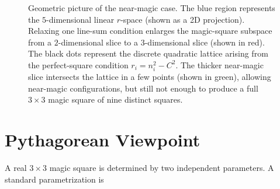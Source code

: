 \documentclass[12pt]{article}
\begin{document}
\begin{figure}[H]
\centering
{}

\caption{Geometric picture of the near-magic case.  The blue region represents
the $5$-dimensional linear $r$-space (shown as a 2D projection).  Relaxing one
line-sum condition enlarges the magic-square subspace from a $2$-dimensional
slice to a $3$-dimensional slice (shown in red).  The black dots represent the
discrete quadratic lattice arising from the perfect-square condition
$r_i = n_i^2 - C^2$.  The thicker near-magic slice intersects the lattice in a
few points (shown in green), allowing near-magic configurations, but still not
enough to produce a full $3\times 3$ magic square of nine distinct squares.}
\label{fig:near-magic-geometry}
\end{figure}

\vspace{5em} %
\section*{Pythagorean Viewpoint}

A real $3\times 3$ magic square is determined by two independent parameters.
A standard parametrization is
\end{document}
